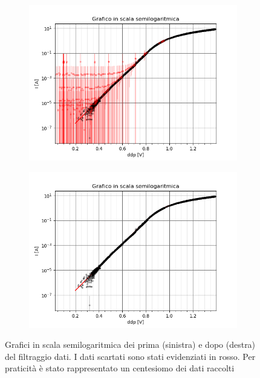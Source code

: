 \documentclass{article}[a4paper, oneside, 11pt]
\begin{document}
\begin{figure}[H]
\centering
\begin{subfigure}{.5\textwidth}
	\centering 
 		\includegraphics[scale=0.5]{./nofilter.png}
	\label{fig: nofilter}
\end{subfigure}%
\begin{subfigure}{.5\textwidth}
	\centering 
 		\includegraphics[scale=0.5]{./filtered.png}
	\label{fig: filtered}
\end{subfigure}
	\caption{Grafici in scala semilogaritmica dei prima (sinistra) e dopo (destra) del filtraggio dati. I dati scartati sono stati evidenziati in rosso. Per praticità è stato rappresentato un centesiomo dei dati raccolti}
\end{figure}
\end{document}
